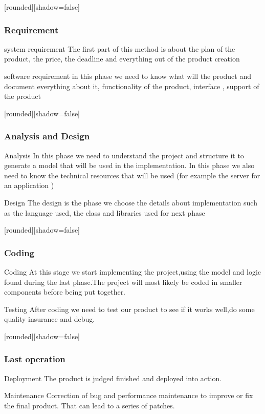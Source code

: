 \documentclass[10pt]{beamer}
\begin{document}
\begin{frame}[plain]
[rounded][shadow=false]
\frametitle{Requirement}

\begin{block}{system requirement}
The first part of this method is about the plan of the product, the price, the deadline and everything out of the product creation
\end{block}

\begin{block}{software requirement}
in this phase we need to know what will the product and document everything about it, functionality of the product, interface , support of the product  
\end{block}
\end{frame}
\begin{frame}[plain]
[rounded][shadow=false]
\frametitle{Analysis and Design}

\begin{block}{Analysis}
In this phase we need to understand the project and structure it to generate a model that will be used in the implementation. In this phase we also need to know the technical resources that will be used (for example the server for an application )
\end{block}
\begin{block}{Design}
The design is the phase we choose the details about implementation such as the language used, the class and libraries used for next phase

\end{block}
\end{frame}


\begin{frame}[plain]
[rounded][shadow=false]
\frametitle{Coding}
\begin{block}{Coding}
At this stage we start implementing the project,using the model and logic found during the last phase.The project will most likely be coded in smaller components before being put together.
\end{block}

\begin{block}{Testing}
After coding we need to test our product to see if it works well,do some quality insurance and debug.
\end{block}
\end{frame}

\begin{frame}[plain]
[rounded][shadow=false]
\frametitle{Last operation}
\begin{block}{Deployment}
The product is judged finished and deployed into action.
\end{block}
\begin{block}{Maintenance}
Correction of bug and performance maintenance to improve or fix the final product. That can lead to a series of patches. 
\end{block}
    

\end{frame}


\end{document}
